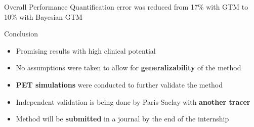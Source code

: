 \documentclass[aspectratio=169]{beamer}
\begin{document}
\begin{frame}[t]{Overall Performance}
	Quantification error was reduced from 17\% with GTM to 10\% with Bayesian GTM
	\begin{center}
	\end{center}
\end{frame}


\begin{frame}{Conclusion}
	\begin{itemize}
		\setlength\itemsep{2em}
		\item Promising results with high clinical potential
		\item No assumptions were taken to allow for \textbf{generalizability} of the method
		\item \textbf{PET simulations} were conducted to further validate the method
		\item Independent validation is being done by Paris-Saclay with \textbf{another tracer}
		\item Method will be \textbf{submitted} in a journal by the end of the internship
	\end{itemize}

\end{frame}
\end{document}

